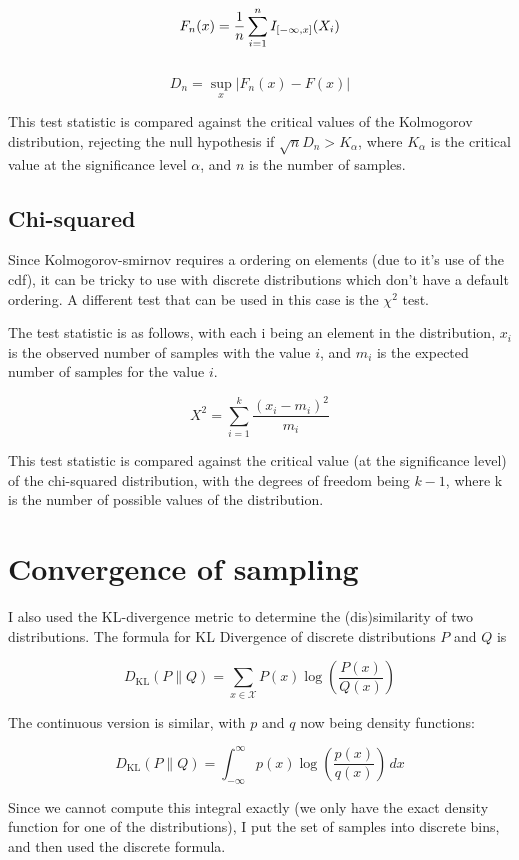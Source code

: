 $$F_{n}(x)={1 \over n}\sum _{i=1}^{n}I_{[-\infty ,x]}(X_{i})$$\\
$$D_{n}=\sup _{x}|F_{n}(x)-F(x)|$$

This test statistic is compared against the critical values of the Kolmogorov distribution, rejecting the null hypothesis if $\sqrt{n}D_n > K_\alpha$, where $K_\alpha$ is the critical value at the significance level $\alpha$, and $n$ is the number of samples.

\subsection{Chi-squared}

Since Kolmogorov-smirnov requires a ordering on elements (due to it's use of the cdf), it can be tricky to use with discrete distributions which don't have a default ordering. A different test that can be used in this case is the $\chi^2$ test.

The test statistic is as follows, with each i being an element in the distribution, $x_i$ is the observed number of samples with the value $i$, and $m_i$ is the expected number of samples for the value $i$.

$$X^{2}=\sum _{i=1}^{k}{\frac {(x_{i}-m_{i})^{2}}{m_{i}}}$$

This test statistic is compared against the critical value (at the significance level) of the chi-squared distribution, with the degrees of freedom being $k-1$, where k is the number of possible values of the distribution.

\section{Convergence of sampling}

I also used the KL-divergence metric to determine the (dis)similarity of two distributions. The formula for KL Divergence of discrete distributions $P$ and $Q$ is

$${D_{\text{KL}}(P\parallel Q)=\sum _{x\in {\mathcal {X}}}P(x)\log \left({\frac {P(x)}{Q(x)}}\right)}$$

The continuous version is similar, with $p$ and $q$ now being density functions:

$${D_\text{KL}}(P\parallel Q)=\int _{-\infty }^{\infty }p(x)\log \left({\frac {p(x)}{q(x)}}\right)\,dx$$

Since we cannot compute this integral exactly (we only have the exact density function for one of the distributions), I put the set of samples into discrete bins, and then used the discrete formula.

